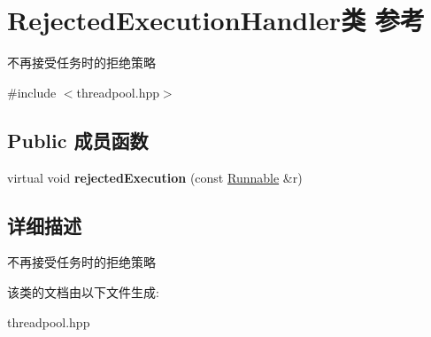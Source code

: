 \hypertarget{classRejectedExecutionHandler}{}\section{Rejected\+Execution\+Handler类 参考}
\label{classRejectedExecutionHandler}


不再接受任务时的拒绝策略  




{\ttfamily \#include $<$threadpool.\+hpp$>$}

\subsection*{Public 成员函数}
\begin{DoxyCompactItemize}
\item 
\mbox{\label{classRejectedExecutionHandler_abb6476c7d64a7bd3111fc1a39829858b}} 
virtual void {\bfseries rejected\+Execution} (const \hyperlink{classRunnable}{Runnable} \&r)
\end{DoxyCompactItemize}


\subsection{详细描述}
不再接受任务时的拒绝策略 

该类的文档由以下文件生成\+:\begin{DoxyCompactItemize}
\item 
threadpool.\+hpp\end{DoxyCompactItemize}
